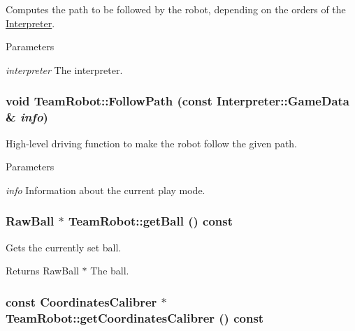 Computes the path to be followed by the robot, depending on the orders of the \hyperlink{classInterpreter}{Interpreter}. 


\begin{DoxyParams}{Parameters}
\item[{\em interpreter}]The interpreter. \end{DoxyParams}
\hypertarget{classTeamRobot_a02df00aae0a514badc93a9b2593be85f}{
\subsubsection[{FollowPath}]{\setlength{\rightskip}{0pt plus 5cm}void TeamRobot::FollowPath (const {\bf Interpreter::GameData} \& {\em info})}}
\label{classTeamRobot_a02df00aae0a514badc93a9b2593be85f}


High-\/level driving function to make the robot follow the given path. 


\begin{DoxyParams}{Parameters}
\item[{\em info}]Information about the current play mode. \end{DoxyParams}
\hypertarget{classTeamRobot_a86dbc3bbf6fdcebd4ae41a6f68d92a15}{
\subsubsection[{getBall}]{\setlength{\rightskip}{0pt plus 5cm}RawBall $\ast$ TeamRobot::getBall () const}}
\label{classTeamRobot_a86dbc3bbf6fdcebd4ae41a6f68d92a15}


Gets the currently set ball. 

\begin{DoxyReturn}{Returns}
RawBall $\ast$ The ball. 
\end{DoxyReturn}
\hypertarget{classTeamRobot_a3ef7d4538226085ed4d92b8bd2fce67d}{
\subsubsection[{getCoordinatesCalibrer}]{\setlength{\rightskip}{0pt plus 5cm}const {\bf CoordinatesCalibrer} $\ast$ TeamRobot::getCoordinatesCalibrer () const}}
\label{classTeamRobot_a3ef7d4538226085ed4d92b8bd2fce67d}


